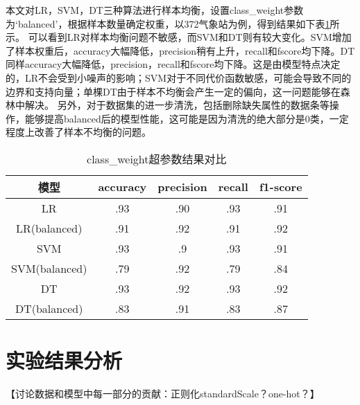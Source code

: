 \documentclass[UTF8]{ctexart}
\begin{document}
本文对LR，SVM，DT三种算法进行样本均衡，设置class\_weight参数为‘balanced’，根据样本数量确定权重，以372气象站为例，得到结果如下表\ref{tab:class}所示。
可以看到LR对样本均衡问题不敏感，而SVM和DT则有较大变化。SVM增加了样本权重后，accuracy大幅降低，precision稍有上升，recall和fscore均下降。DT同样accuracy大幅降低，precision，recall和fscore均下降。这是由模型特点决定的，LR不会受到小噪声的影响；SVM对于不同代价函数敏感，可能会导致不同的边界和支持向量；单棵DT由于样本不均衡会产生一定的偏向，这一问题能够在森林中解决。
另外，对于数据集的进一步清洗，包括删除缺失属性的数据条等操作，能够提高balanced后的模型性能，这可能是因为清洗的绝大部分是0类，一定程度上改善了样本不均衡的问题。

\begin{table}[htb]
  \centering
  \begin{minipage}[t]{0.9\linewidth}
  \centering
  \caption{class\_weight超参数结果对比}
  \label{tab:class}
    \begin{tabular}{ccccc}
      \toprule[1pt]
      模型 & accuracy & precision & recall & f1-score \\
      \midrule[0.5pt]
      LR & .93 & .90 & .93 & .91\\
      LR(balanced) &  .91 & .92 &.91 &.92 \\
      SVM &.93 &.9 &.93 & .91   \\
      SVM(balanced) & .79 & .92& .79& .84 \\
      DT & .93 & .92 & .93 & .92\\
      DT(balanced) & .83 &.91 &.83 &.87 \\
      \bottomrule[1pt]
    \end{tabular}
  \end{minipage}
\end{table}



\section{实验结果分析}

【讨论数据和模型中每一部分的贡献：正则化standardScale？one-hot？】
\end{document}

